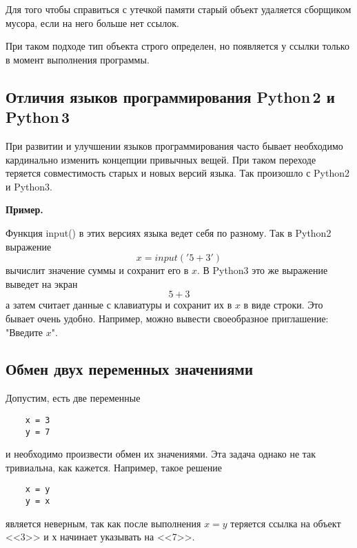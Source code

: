 \documentclass[a4paper, fleqn]{article}
\newenvironment{example}[1][]{\medskip \noindent \textbf{Пример. #1}\par \nopagebreak}{\medskip \par} %
\begin{document}
		Для того чтобы справиться с утечкой памяти старый объект удаляется сборщиком мусора, если на него больше нет ссылок.
		
		При таком подходе тип объекта строго определен, но появляется у ссылки только в момент выполнения программы.
		
		
		
	\subsection*{Отличия языков программирования Python\,2 и Python\,3}
	
		При развитии и улучшении языков программирования часто бывает необходимо кардинально изменить концепции привычных вещей. При таком переходе теряется совместимость старых и новых версий языка. Так произошло с Python2 и Python3. 
		
		\begin{example}
		
		Функция input() в этих версиях языка ведет себя по разному. Так в Python2 выражение
			\[x = input('5 + 3')\]
			вычислит значение суммы и сохранит его в $x$.
			В Python3 это же выражение выведет на экран\\
			\[5 + 3\]
			а затем считает данные с клавиатуры и сохранит их в $x$ в виде строки.
			Это бывает очень удобно. Например, можно вывести своеобразное приглашение: "Введите $x$". 
			
		\end{example}
		
	\subsection*{Обмен двух переменных значениями}
	
	
	Допустим, есть две переменные 
	\begin{lstlisting}
	x = 3
	y = 7
	\end{lstlisting}
	и необходимо произвести обмен их значениями. Эта задача однако не так тривиальна, как кажется. Например, такое решение 
	\begin{lstlisting}
	x = y
	y = x
	\end{lstlisting}
	является неверным, так как после выполнения $x=y$ теряется ссылка на объект <<3>> и $х$ начинает указывать на <<7>>.
	
\end{document}
